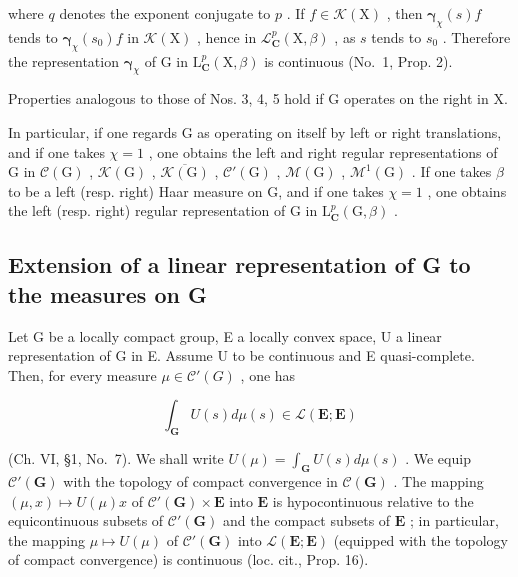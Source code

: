 where \(q\) denotes the exponent conjugate to \(p\) . If \(f \in \mathcal{K}(\mathrm{X})\) , then \(\boldsymbol{\gamma}_{\chi}(s)f\) tends to \(\boldsymbol{\gamma}_{\chi}(s_0)f\) in \(\mathcal{K}(\mathrm{X})\) , hence in \(\mathcal{L}_{\mathbf{C}}^{p}(\mathrm{X},\beta)\) , as \(s\) tends to \(s_0\) . Therefore the representation \(\boldsymbol{\gamma}_{\chi}\) of \(\mathrm{G}\) in \(\mathrm{L}_{\mathbf{C}}^{p}(\mathrm{X},\beta)\) is continuous (No.~1, Prop. 2).

Properties analogous to those of Nos. 3, 4, 5 hold if G operates on the right in X.

In particular, if one regards G as operating on itself by left or right translations, and if one takes \(\chi = 1\) , one obtains the left and right regular representations of G in \(\mathcal{C}(\mathrm{G})\) , \(\mathcal{K}(\mathrm{G})\) , \(\overline{\mathcal{K}(\mathrm{G})}\) , \(\mathcal{C}'(\mathrm{G})\) , \(\mathcal{M}(\mathrm{G})\) , \(\mathcal{M}^{1}(\mathrm{G})\) . If one takes \(\beta\) to be a left (resp. right) Haar measure on G, and if one takes \(\chi = 1\) , one obtains the left (resp. right) regular representation of G in \(\mathrm{L}_{\mathbf{C}}^{p}(\mathrm{G}, \beta)\) .

\subsection{Extension of a linear representation of G to the measures on G}

Let G be a locally compact group, E a locally convex space, U a linear representation of G in E. Assume U to be continuous and E quasi-complete. Then, for every measure \(\mu \in \mathcal{C}'(G)\) , one has

\[
\int_ {\mathbf {G}} U (s) d \mu (s) \in \mathcal {L} (\mathbf {E}; \mathbf {E})
\]

(Ch. VI, §1, No.~7). We shall write \(U(\mu) = \int_{\mathbf{G}} U(s) d\mu(s)\) . We equip \(\mathcal{C}'(\mathbf{G})\) with the topology of compact convergence in \(\mathcal{C}(\mathbf{G})\) . The mapping \((\mu, x) \mapsto U(\mu)x\) of \(\mathcal{C}'(\mathbf{G}) \times \mathbf{E}\) into \(\mathbf{E}\) is hypocontinuous relative to the equicontinuous subsets of \(\mathcal{C}'(\mathbf{G})\) and the compact subsets of \(\mathbf{E}\) ; in particular, the mapping \(\mu \mapsto U(\mu)\) of \(\mathcal{C}'(\mathbf{G})\) into \(\mathcal{L}(\mathbf{E}; \mathbf{E})\) (equipped with the topology of compact convergence) is continuous (loc. cit., Prop. 16).

